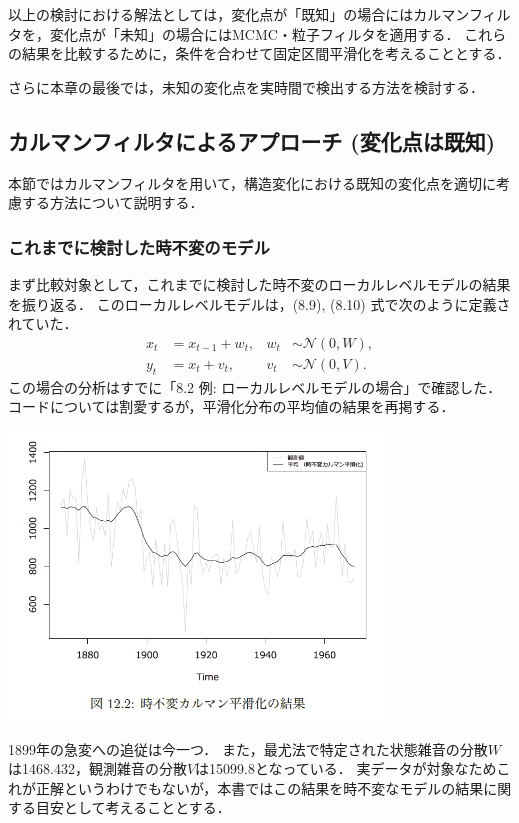 \documentclass[11pt,a4paper]{jsarticle}
\numberwithin{equation}{section}
\begin{document}
以上の検討における解法としては，変化点が「既知」の場合にはカルマンフィルタを，変化点が「未知」の場合にはMCMC・粒子フィルタを適用する．
これらの結果を比較するために，条件を合わせて固定区間平滑化を考えることとする．

さらに本章の最後では，未知の変化点を実時間で検出する方法を検討する．

\subsection{カルマンフィルタによるアプローチ (変化点は既知)}
本節ではカルマンフィルタを用いて，構造変化における既知の変化点を適切に考慮する方法について説明する．

\subsubsection{これまでに検討した時不変のモデル}
まず比較対象として，これまでに検討した時不変のローカルレベルモデルの結果を振り返る．
このローカルレベルモデルは，(8.9), (8.10) 式で次のように定義されていた．
\begin{align}
x_t
& =
x_{t-1} + w_t, & w_t & \sim \mathcal{N} (0, W), \\
y_t
& =
x_t + v_t, & v_t & \sim \mathcal{N} (0, V).
\end{align}
この場合の分析はすでに「8.2 例: ローカルレベルモデルの場合」で確認した．
コードについては割愛するが，平滑化分布の平均値の結果を再掲する．
\begin{center}
\includegraphics[width=10cm]{img/Figure12_2.png}
\end{center}

1899年の急変への追従は今一つ．
また，最尤法で特定された状態雑音の分散$W$は1468.432，観測雑音の分散$V$は15099.8となっている．
実データが対象なためこれが正解というわけでもないが，本書ではこの結果を時不変なモデルの結果に関する目安として考えることとする．
\end{document}
